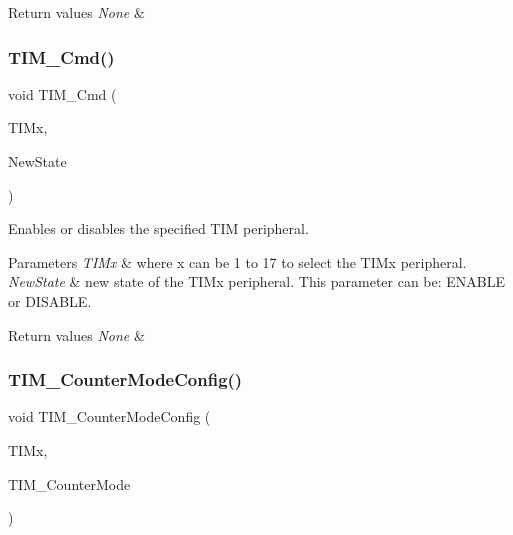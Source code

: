 \begin{DoxyRetVals}{Return values}
{\em None} & \\
\hline
\end{DoxyRetVals}
\mbox{\label{group___t_i_m___private___functions_ga2bdc275bcbd2ce9d1ba632e6c89896b7}} 
\subsubsection{\texorpdfstring{TIM\_Cmd()}{TIM\_Cmd()}}
{\footnotesize\ttfamily void T\+I\+M\+\_\+\+Cmd (\begin{DoxyParamCaption}\item[{\mbox{\hyperlink{struct_t_i_m___type_def}{T\+I\+M\+\_\+\+Type\+Def}} $\ast$}]{T\+I\+Mx,  }\item[{\mbox{\hyperlink{group___exported__types_gac9a7e9a35d2513ec15c3b537aaa4fba1}{Functional\+State}}}]{New\+State }\end{DoxyParamCaption})}



Enables or disables the specified T\+IM peripheral. 


\begin{DoxyParams}{Parameters}
{\em T\+I\+Mx} & where x can be 1 to 17 to select the T\+I\+Mx peripheral. \\
\hline
{\em New\+State} & new state of the T\+I\+Mx peripheral. This parameter can be\+: E\+N\+A\+B\+LE or D\+I\+S\+A\+B\+LE. \\
\hline
\end{DoxyParams}

\begin{DoxyRetVals}{Return values}
{\em None} & \\
\hline
\end{DoxyRetVals}
\mbox{\label{group___t_i_m___private___functions_ga93941c1db20bf3794f377307df90a67b}} 
\subsubsection{\texorpdfstring{TIM\_CounterModeConfig()}{TIM\_CounterModeConfig()}}
{\footnotesize\ttfamily void T\+I\+M\+\_\+\+Counter\+Mode\+Config (\begin{DoxyParamCaption}\item[{\mbox{\hyperlink{struct_t_i_m___type_def}{T\+I\+M\+\_\+\+Type\+Def}} $\ast$}]{T\+I\+Mx,  }\item[{uint16\+\_\+t}]{T\+I\+M\+\_\+\+Counter\+Mode }\end{DoxyParamCaption})}



